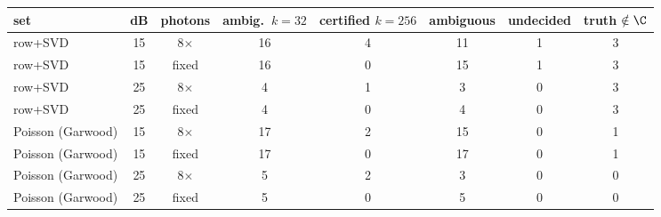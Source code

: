 \begin{tabular}{@{}lcccccc c@{}}\toprule
set & dB & photons & ambig.\ $k{=}32$ & certified $k{=}256$ & ambiguous & undecided & truth $\notin\C$\\\midrule
row+SVD & 15 & 8$\times$ & 16 & 4 & 11 & 1 & 3\\
row+SVD & 15 & fixed & 16 & 0 & 15 & 1 & 3\\
row+SVD & 25 & 8$\times$ & 4 & 1 & 3 & 0 & 3\\
row+SVD & 25 & fixed & 4 & 0 & 4 & 0 & 3\\
Poisson (Garwood) & 15 & 8$\times$ & 17 & 2 & 15 & 0 & 1\\
Poisson (Garwood) & 15 & fixed & 17 & 0 & 17 & 0 & 1\\
Poisson (Garwood) & 25 & 8$\times$ & 5 & 2 & 3 & 0 & 0\\
Poisson (Garwood) & 25 & fixed & 5 & 0 & 5 & 0 & 0\\
\bottomrule\end{tabular}
